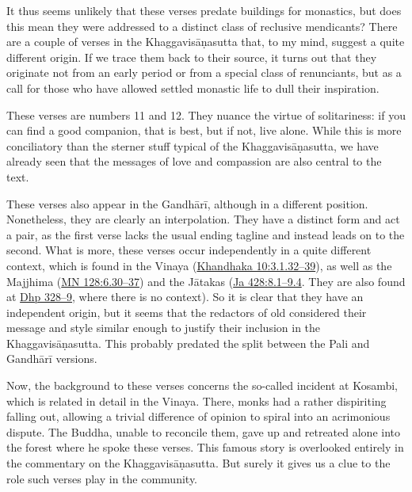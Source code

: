 \documentclass[12pt,openany]{book}%
\begin{document}
It thus seems unlikely that these verses predate buildings for monastics, but does this mean they were addressed to a distinct class of reclusive mendicants? There are a couple of verses in the \textsanskrit{Khaggavisāṇasutta} that, to my mind, suggest a quite different origin. If we trace them back to their source, it turns out that they originate not from an early period or from a special class of renunciants, but as a call for those who have allowed settled monastic life to dull their inspiration.

These verses are numbers 11 and 12. They nuance the virtue of solitariness: if you can find a good companion, that is best, but if not, live alone. While this is more conciliatory than the sterner stuff typical of the \textsanskrit{Khaggavisāṇasutta}, we have already seen that the messages of love and compassion are also central to the text.

These verses also appear in the \textsanskrit{Gandhārī}, although in a different position. Nonetheless, they are clearly an interpolation. They have a distinct form and act a pair, as the first verse lacks the usual ending tagline and instead leads on to the second. What is more, these verses occur independently in a quite different context, which is found in the Vinaya (\href{https://suttacentral.net/pli{-}tv{-}kd10/en/brahmali\#3.1.32}{Khandhaka 10:3.1.32–39}), as well as the Majjhima (\href{https://suttacentral.net/mn128/en/sujato\#6.30}{MN 128:6.30–37}) and the \textsanskrit{Jātakas} (\href{https://suttacentral.net/ja428}{Ja 428:8.1–9.4}. They are also found at \href{https://suttacentral.net/dhp328/en/sujato}{Dhp 328–9}, where there is no context). So it is clear that they have an independent origin, but it seems that the redactors of old considered their message and style similar enough to justify their inclusion in the \textsanskrit{Khaggavisāṇasutta}. This probably predated the split between the Pali and \textsanskrit{Gandhārī} versions.

Now, the background to these verses concerns the so-called incident at Kosambi, which is related in detail in the Vinaya. There, monks had a rather dispiriting falling out, allowing a trivial difference of opinion to spiral into an acrimonious dispute. The Buddha, unable to reconcile them, gave up and retreated alone into the forest where he spoke these verses. This famous story is overlooked entirely in the commentary on the \textsanskrit{Khaggavisāṇasutta}. But surely it gives us a clue to the role such verses play in the community.
\end{document}
